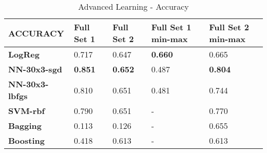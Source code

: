 \documentclass[10pt, conference, compsocconf]{IEEEtran}
\begin{document}
\begin{center}
	\begin{table}[t]
		\centering \footnotesize
		\vspace{0.01cm}
		\caption{Advanced Learning - Accuracy}
		\hspace{1cm}
		\begin{tabularx}{\linewidth}{ l  X  X  X  X }
			\hline
			\textbf{ACCURACY} &	\textbf{Full Set 1}&	\textbf{Full Set 2}&	\textbf{Full Set 1 min-max}&	\textbf{Full Set 2 min-max} \\ \hline
			
			
			\textbf{LogReg}&	0.717&	0.647&	\textbf{0.660}&	0.665\\ \hline
			\textbf{NN-30x3-sgd}&	\textbf{0.851}&	\textbf{0.652}&	0.487&	\textbf{0.804}\\ \hline
			\textbf{NN-30x3-lbfgs}&	0.810&	0.651&	0.481&	0.744\\ \hline
			\textbf{SVM-rbf}&	0.790&	0.651&	-&	0.770\\ \hline
			\textbf{Bagging}&	0.113&	0.126&	-&	0.655\\ \hline
			\textbf{Boosting}&	0.418&	0.613&	-&	0.613 \\ \hline
			
			
		\end{tabularx}\newline
		\vspace{-0.05cm}
		\label{Table5}
	\end{table} \hfil
\end{center}
\end{document}
